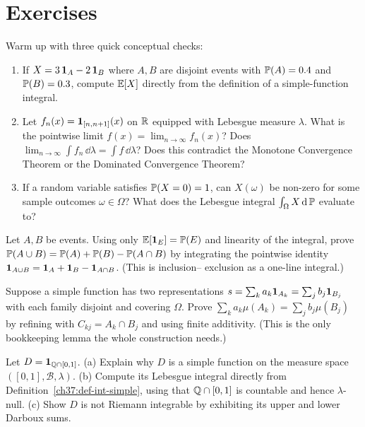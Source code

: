 \section{Exercises}
\label{ch37:exercises}

\begin{exercise}
\label{ch37:ex-warmup}
Warm up with three quick conceptual checks:
\begin{enumerate}
  \item If $X = 3\,\ind_A - 2\,\ind_B$ where $A, B$ are disjoint events with $\P(A) = 0.4$ and $\P(B) = 0.3$, compute $\E[X]$ directly from the definition of a simple-function integral.
  \item Let $f_n(x) = \ind_{[n, n+1]}(x)$ on $\R$ equipped with Lebesgue measure $\lambda$. What is the pointwise limit $f(x) = \lim_{n\to\infty} f_n(x)$? Does $\lim_{n\to\infty}\int f_n\,\dd\lambda = \int f\,\dd\lambda$? Does this contradict the Monotone Convergence Theorem or the Dominated Convergence Theorem?
  \item If a random variable satisfies $\P(X = 0) = 1$, can $X(\omega)$ be non-zero for some sample outcomes $\omega \in \Omega$? What does the Lebesgue integral $\int_\Omega X\,\dd\P$ evaluate to?
\end{enumerate}
\end{exercise}

\begin{exercise}
\label{ch37:ex-indicator}
Let $A,B$ be events. Using only $\E[\ind_E]=\P(E)$ and linearity of the integral,
prove $\P(A\cup B)=\P(A)+\P(B)-\P(A\cap B)$ by integrating the pointwise
identity $\ind_{A\cup B}=\ind_A+\ind_B-\ind_{A\cap B}$. (This is inclusion--
exclusion as a one-line integral.)
\end{exercise}

\begin{exercise}
\label{ch37:ex-welldef}
Suppose a simple function has two representations $s=\sum_k a_k\ind_{A_k}=\sum_j
b_j\ind_{B_j}$ with each family disjoint and covering $\Omega$. Prove
$\sum_k a_k\mu(A_k)=\sum_j b_j\mu(B_j)$ by refining with $C_{kj}=A_k\cap B_j$
and using finite additivity. (This is the only bookkeeping lemma the whole
construction needs.)
\end{exercise}

\begin{exercise}
\label{ch37:ex-dirichlet}
Let $D=\ind_{\Q\cap[0,1]}$. (a) Explain why $D$ is a simple function on the
measure space $([0,1],\mathcal B,\lambda)$. (b) Compute its Lebesgue integral
directly from Definition~\ref{ch37:def-int-simple}, using that $\Q\cap[0,1]$ is
countable and hence $\lambda$-null. (c) Show $D$ is not Riemann integrable by
exhibiting its upper and lower Darboux sums.
\end{exercise}

